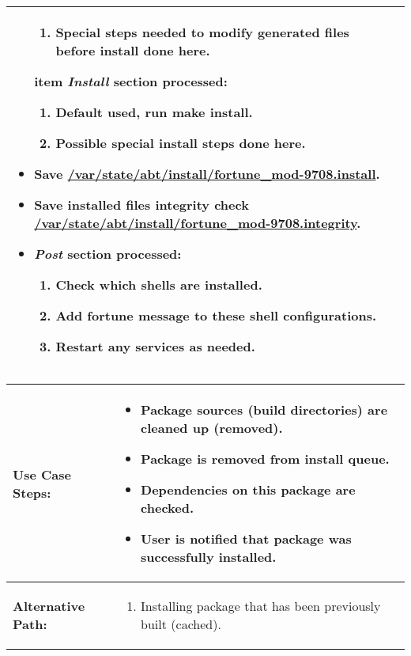 \begin{tabularx}{\linewidth}{|l|X|}
\begin{minipage}{\linewidth}
\begin{itemize}
\begin{enumerate}
      \item Special steps needed to modify generated files before install done here.
    \end{enumerate}
    item \emph{Install} section processed:
    \begin{enumerate}
      \item Default used, run \textbf{make install}.
      \item Possible special install steps done here.
    \end{enumerate}
    \item Save \url{/var/state/abt/install/fortune_mod-9708.install}.
    \item Save installed files integrity check \url{/var/state/abt/install/fortune_mod-9708.integrity}.
    \item \emph{Post} section processed:
    \begin{enumerate}
      \item Check which shells are installed.
      \item Add fortune message to these shell configurations.
      \item Restart any services as needed.
    \end{enumerate}
  \end{itemize}
  \vspace{0.05em}
\end{minipage}
\\
\hline 
\end{tabularx}



\begin{tabularx}{\linewidth}{|l|X|}
\hline
\textbf{Use Case Steps:} & 
\begin{minipage}{\linewidth}
  \vspace{0.05em}
  \begin{itemize}
    \item Package sources (build directories) are cleaned up (removed).
    \item Package is removed from install queue.
    \item Dependencies on this package are checked.
    \item User is notified that package was successfully installed.
  \end{itemize}
  \vspace{0.05em}
\end{minipage}
\\
\hline 
\textbf{Alternative Path:} &
\begin{minipage}{\linewidth}
  \vspace{0.05em} 
  \begin{enumerate}
    \item Installing package that has been previously built (cached).
  \end{enumerate}
  \vspace{0.05em} 
\end{minipage}
\\
\hline
\end{tabularx}

\newpage


